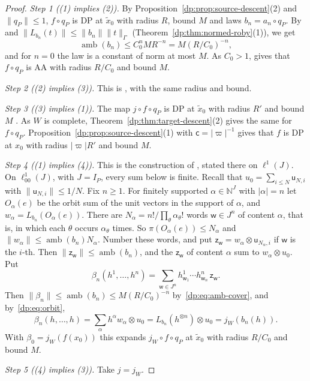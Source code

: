 \documentclass[11pt]{amsart}
\theoremstyle{definition}
\theoremstyle{remark}
\numberwithin{equation}{section}
\newcommand{\N}{\mathbb N}
\newcommand{\abs}[1]{\lvert #1\rvert}
\newcommand{\norm}[1]{\lVert #1\rVert}
\theoremstyle{plain}
\theoremstyle{definition}
\theoremstyle{plain}
\begin{document}
\begin{proof}
\emph{Step 1 ((1) implies (2)).} By Proposition~\ref{dp:prop:source-descent}(2) and $\norm{q_P}\le1$, $f\circ q_P$ is DP at $\tilde x_0$ with radius $R$, bound $M$ and laws $b_n=a_n\circ q_P$. By \cite[Theorem~14.39(2)]{I} and $\norm{L_{b_n}(t)}\le\norm{b_n}\norm t_\Gamma$ (Theorem~\ref{dp:thm:normed-roby}(1)), we get
\begin{equation}\label{dp:eq:amb-cover}
 \operatorname{amb}(b_n)\le C_0^nMR^{-n}=M(R/C_0)^{-n},
\end{equation}
and for $n=0$ the law is a constant of norm at most $M$. As $C_0>1$, \cite[Proposition~14.9(1)]{I} gives that $f\circ q_P$ is AA with radius $R/C_0$ and bound $M$.

\emph{Step 2 ((2) implies (3)).} This is \cite[Remark~14.13]{I}, with the same radius and bound.

\emph{Step 3 ((3) implies (1)).} The map $j\circ f\circ q_P$ is DP at $\tilde x_0$ with radius $R'$ and bound $M$ \cite[Proposition~14.9(1)]{I}. As $W$ is complete, Theorem~\ref{dp:thm:target-descent}(2) gives the same for $f\circ q_P$. Proposition~\ref{dp:prop:source-descent}(1) with $\mathsf c=\abs\varpi^{-1}$ gives that $f$ is DP at $x_0$ with radius $\abs\varpi R'$ and bound $M$.

\emph{Step 4 ((1) implies (4)).} This is the construction of \cite[Remark~14.41]{I}, stated there on $\ell^1(J)$. On $\ell^1_{00}(J)$, with $J=I_P$, every sum below is finite. Recall that $u_0=\sum_{i\le N}\mathsf u_{N,i}$ with $\norm{\mathsf u_{N,i}}\le1/N$. Fix $n\ge1$. For finitely supported $\alpha\in\N^J$ with $\abs\alpha=n$ let $O_\alpha(e)$ be the orbit sum of the unit vectors in the support of $\alpha$, and $w_\alpha=L_{b_n}(O_\alpha(e))$. There are $N_\alpha=n!/\prod_\theta\alpha_\theta!$ words $\mathsf w\in J^n$ of content $\alpha$, that is, in which each $\theta$ occurs $\alpha_\theta$ times. So $\pi(O_\alpha(e))\le N_\alpha$ and $\norm{w_\alpha}\le\operatorname{amb}(b_n)N_\alpha$. Number these words, and put $\mathsf z_{\mathsf w}=w_\alpha\otimes\mathsf u_{N_\alpha,i}$ if $\mathsf w$ is the $i$-th. Then $\norm{\mathsf z_{\mathsf w}}\le\operatorname{amb}(b_n)$, and the $\mathsf z_{\mathsf w}$ of content $\alpha$ sum to $w_\alpha\otimes u_0$. Put
\[
 \beta_n(h^1,\dots,h^n)=\sum_{\mathsf w\in J^n}h^1_{\mathsf w_1}\cdots h^n_{\mathsf w_n}\,\mathsf z_{\mathsf w}.
\]
Then $\norm{\beta_n}\le\operatorname{amb}(b_n)\le M(R/C_0)^{-n}$ by~\eqref{dp:eq:amb-cover}, and by~\eqref{dp:eq:orbit},
\[
 \beta_n(h,\dots,h)=\sum_\alpha h^\alpha w_\alpha\otimes u_0=L_{b_n}(h^{\otimes n})\otimes u_0=j_W(b_n(h)).
\]
With $\beta_0=j_W(f(x_0))$ this expands $j_W\circ f\circ q_P$ at $\tilde x_0$ with radius $R/C_0$ and bound $M$.

\emph{Step 5 ((4) implies (3)).} Take $j=j_W$.
\end{proof}
\end{document}

